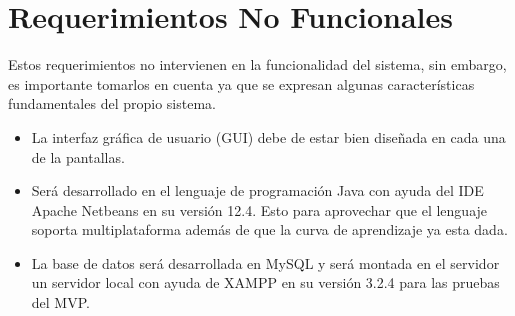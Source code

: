 \section{Requerimientos No Funcionales}
Estos requerimientos no intervienen en la funcionalidad del sistema, sin embargo, es importante tomarlos en cuenta ya que se expresan algunas características fundamentales del propio sistema.
\begin{itemize}
	\item La interfaz gráfica de usuario (GUI) debe de estar bien diseñada en cada una de la pantallas.
	\item Será desarrollado en el lenguaje de programación Java con ayuda del IDE Apache Netbeans en su versión 12.4. Esto para aprovechar que el lenguaje soporta multiplataforma además de que la curva de aprendizaje ya esta dada. 
	\item La base de datos será desarrollada en MySQL y será montada en el servidor un servidor local con ayuda de XAMPP en su versión 3.2.4 para las pruebas del MVP. 
\end{itemize}